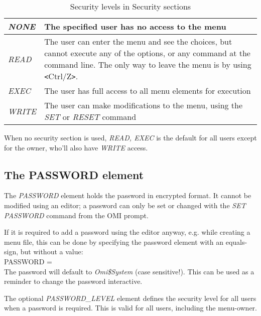 \documentclass[a4paper]{book}
\newcommand{\vs}{\vspace{3mm}}
\newcommand{\lt}{\texttt{<}}
\newcommand{\gt}{\texttt{>}}
\renewcommand{\indent}{\hspace*{5mm}}
\begin{document}
\begin{table}[ht]
\begin{minipage}[t]{\textwidth}
\begin{tabular}{lp{9cm}} \hline
\textsl{NONE} & The specified user has no access to the menu \\ \hline
\textsl{READ} & The user can enter the menu and see the choices, but cannot execute any of the options, or any command at the command line. The only way to leave the menu is by using \lt Ctrl/Z\gt . \\ \hline
\textsl{EXEC} &  The user has full access to all menu elements for execution \\ \hline
\textsl{WRITE} & The user can make modifications to the menu, using the \textsl{SET} or \textsl{RESET} command \\ \hline
\end{tabular}
\caption{Security levels in Security sections}\label{tab:seclevels}
\end{minipage}
\end{table}

When no security section is used, \textsl{READ, EXEC} is the default for all 
users except for the owner, who'll also have \textsl{WRITE} access.

\subsection{The PASSWORD element}
\label{subsubsec:mylabel33}

The \textsl{PASSWORD} element holds 
the password in encrypted format. It cannot be modified using an editor; a 
password can only be set or changed with the \textsl{SET PASSWORD} command from the OMI prompt.

\vs

If it is required to add a password using the editor anyway, e.g. while 
creating a menu file, this can be done by specifying the password element 
with an equals-sign, but without a value: \\
\indent\textsf{PASSWORD =}\\
The password will default to \textsl{Omi{\$}System} (case sensitive!). This can be 
used as a reminder to change the password interactive.

\vs

The optional \textsl{PASSWORD{\_}LEVEL} element defines the security level for all 
users when a password is required. This is valid for all users, including 
the menu-owner.
\end{document}
